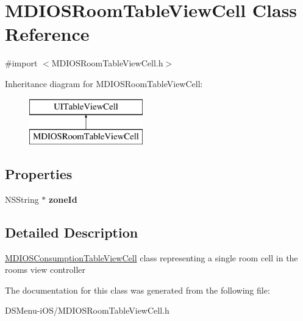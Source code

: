\hypertarget{interface_m_d_i_o_s_room_table_view_cell}{\section{M\-D\-I\-O\-S\-Room\-Table\-View\-Cell Class Reference}
\label{interface_m_d_i_o_s_room_table_view_cell}
}


{\ttfamily \#import $<$M\-D\-I\-O\-S\-Room\-Table\-View\-Cell.\-h$>$}

Inheritance diagram for M\-D\-I\-O\-S\-Room\-Table\-View\-Cell\-:\begin{figure}[H]
\begin{center}
\leavevmode
\includegraphics[height=2.000000cm]{interface_m_d_i_o_s_room_table_view_cell}
\end{center}
\end{figure}
\subsection*{Properties}
\begin{DoxyCompactItemize}
\item 
\hypertarget{interface_m_d_i_o_s_room_table_view_cell_a748cdd6e28902d762d5c76c2321cbe5e}{N\-S\-String $\ast$ {\bfseries zone\-Id}}\label{interface_m_d_i_o_s_room_table_view_cell_a748cdd6e28902d762d5c76c2321cbe5e}

\end{DoxyCompactItemize}


\subsection{Detailed Description}
\hyperlink{interface_m_d_i_o_s_consumption_table_view_cell}{M\-D\-I\-O\-S\-Consumption\-Table\-View\-Cell} class representing a single room cell in the rooms view controller 

The documentation for this class was generated from the following file\-:\begin{DoxyCompactItemize}
\item 
D\-S\-Menu-\/i\-O\-S/M\-D\-I\-O\-S\-Room\-Table\-View\-Cell.\-h\end{DoxyCompactItemize}
